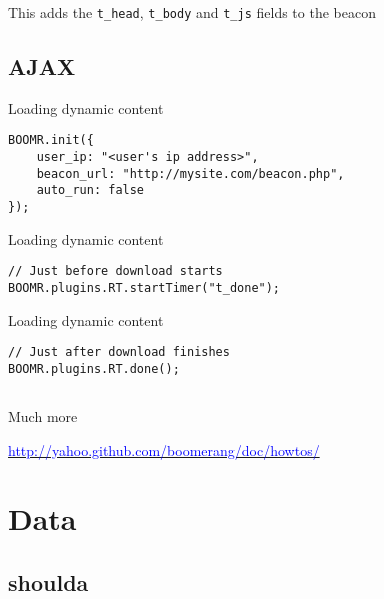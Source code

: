 \documentclass{beamer}
\begin{document}
\begin{frame}{}
  \begin{center}
  This adds the \texttt{t\_head}, \texttt{t\_body} and \texttt{t\_js} fields to the beacon
  \end{center}
\end{frame}

\subsection{AJAX}
\begin{frame}[fragile]{Loading dynamic content}
\begin{verbatim}
BOOMR.init({
    user_ip: "<user's ip address>",
    beacon_url: "http://mysite.com/beacon.php",
    auto_run: false
});
\end{verbatim}
\end{frame}

\begin{frame}[fragile]{Loading dynamic content}
\begin{verbatim}
// Just before download starts
BOOMR.plugins.RT.startTimer("t_done");
\end{verbatim}
\end{frame}

\begin{frame}[fragile]{Loading dynamic content}
\begin{verbatim}
// Just after download finishes
BOOMR.plugins.RT.done();
\end{verbatim}
\end{frame}

\subsection{}

\begin{frame}{Much more}
  \begin{center}
  \href{http://yahoo.github.com/boomerang/doc/howtos/}{\textcolor{blue}{http://yahoo.github.com/boomerang/doc/howtos/}}
  \end{center}
\end{frame}

\section{Data}

\subsection{shoulda}
\end{document}
